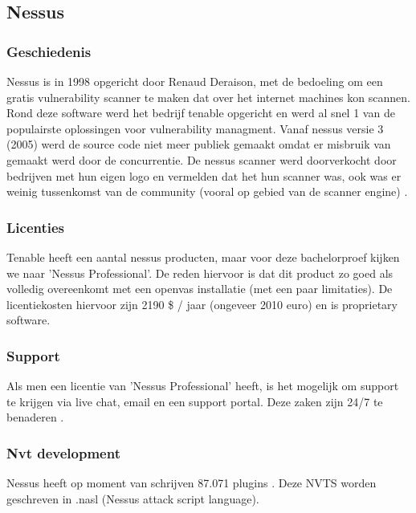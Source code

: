 \subsection{Nessus}


\subsubsection{Geschiedenis}
Nessus is in 1998 opgericht door Renaud Deraison, met de bedoeling om een gratis vulnerability scanner te maken dat over het internet machines kon scannen. Rond deze software werd het bedrijf tenable opgericht en werd al snel 1 van de populairste oplossingen voor vulnerability managment. Vanaf nessus versie 3 (2005) werd de source code niet meer publiek gemaakt omdat er misbruik van gemaakt werd door de concurrentie. De nessus scanner werd doorverkocht door bedrijven met hun eigen logo en vermelden dat het hun scanner was, ook was er weinig tussenkomst van de community (vooral op gebied van de scanner engine) \textcite{Cnet}.

\subsubsection{Licenties}
Tenable heeft een aantal nessus producten, maar voor deze bachelorproef kijken we naar 'Nessus Professional'. De reden hiervoor is dat dit product zo goed als volledig overeenkomt met een openvas installatie (met een paar limitaties). De licentiekosten hiervoor zijn 2190 \$ / jaar (ongeveer 2010 euro) en is proprietary software.
 
\subsubsection{Support}
Als men een licentie van 'Nessus Professional' heeft, is het mogelijk om support te krijgen via live chat, email en een support portal. Deze zaken zijn 24/7 te benaderen \textcite{Nessus-support}.
 
\subsubsection{Nvt development}
Nessus heeft op moment van schrijven 87.071 plugins \textcite{Nessus-nvt}. Deze NVTS worden geschreven in .nasl (Nessus attack script language).

